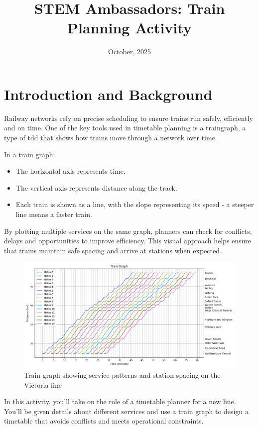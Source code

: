 \documentclass[a4paper]{article}
\title{STEM Ambassadors: Train Planning Activity}
\author{}
\date{October, 2025}
\begin{document}
	\maketitle
	\thispagestyle{fancy}
	
	\section{Introduction and Background}
	
	Railway networks rely on precise scheduling to ensure trains run safely, efficiently and on time. One of the key tools used in timetable planning is a \gls{traingraph}, a type of \gls{tdd} that shows how trains move through a network over time.
	
	In a train graph:
	\begin{itemize}
		\item The horizontal axis represents time.
		\item The vertical axis represents distance along the track.
		\item Each train is shown as a line, with the slope representing its speed - a steeper line means a faster train.
	\end{itemize}
	
	By plotting multiple services on the same graph, planners can check for conflicts, delays and opportunities to improve efficiency. This visual approach helps ensure that trains maintain safe spacing and arrive at stations when expected.
	
	\begin{figure}[h]
		\centering
		\includegraphics[width=\textwidth]{../train-generator/output/victoria.png}
		\caption{Train graph showing service patterns and station spacing on the Victoria line}
		\label{fig:vic-train-graph}
	\end{figure}
	
	In this activity, you'll take on the role of a timetable planner for a new line. You'll be given details about different services and use a train graph to design a timetable that avoids conflicts and meets operational constraints.
	
\end{document}
